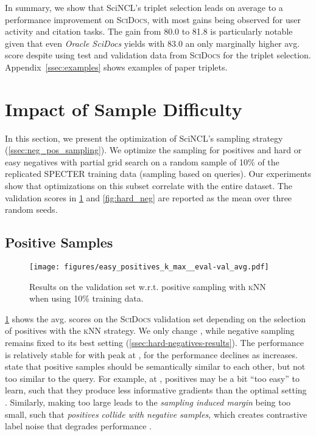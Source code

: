 \documentclass[11pt]{article}
\newcommand{\dataset}{\textsc{SciDocs}\xspace}
\newcommand{\knn}{\textsc{kNN}\xspace}
\newcommand{\sys}{SciNCL\xspace} \newcommand{\baselineCount}{10\xspace}
\newcommand{\oracle}{\textit{Oracle SciDocs}\xspace}
\begin{document}
In summary, we show that \sys's triplet selection leads on average to a performance improvement on \dataset, with most gains being observed for user activity and citation tasks.
The gain from 80.0 to 81.8 is particularly notable  given that even \oracle yields with 83.0 an only marginally higher avg. score despite using test and validation data from \dataset for the triplet selection.
Appendix~\ref{ssec:examples} shows examples of paper triplets.


\section{Impact of Sample Difficulty} \label{sec:hyperparameter-analysis}

In this section, we present the optimization of \sys's sampling strategy (\cref{ssec:neg_pos_sampling}).
We optimize the sampling for positives and hard or easy negatives with partial grid search on a random sample of 10\% of the replicated SPECTER training data (sampling based on queries).
Our experiments show that optimizations on this subset correlate with the entire dataset.
The validation scores in \cref{fig:easy_pos} and \ref{fig:hard_neg} are reported as the mean over three random seeds.


\subsection{Positive Samples}  \label{ssec:positves-results}

\begin{figure}[h]
\centering
\texttt{[image: figures/easy\_positives\_k\_max\_\_eval-val\_avg.pdf]}
\caption{\label{fig:easy_pos}Results on the validation set  w.r.t. positive sampling with \knn when using 10\% training data.}
\end{figure}



\cref{fig:easy_pos} shows the avg. scores on the \dataset validation set depending on the selection of positives with the \knn strategy. 
We only change , while negative sampling remains fixed to its best setting (\cref{ssec:hard-negatives-results}).
The performance is relatively stable for  with peak at , for  the performance declines as  increases.
\citet{PositivesSimilarImportant} state that positive samples should be semantically similar to each other, but not too similar to the query. For example, at , positives may be a bit ``too easy'' to learn, such that they produce less informative gradients than the optimal setting .
Similarly, making  too large leads to the \emph{sampling induced margin} being too small, such that \emph{positives collide with negative samples}, which creates contrastive label noise that degrades performance \citep{ContrastiveLearningLimitations}. 
\end{document}
